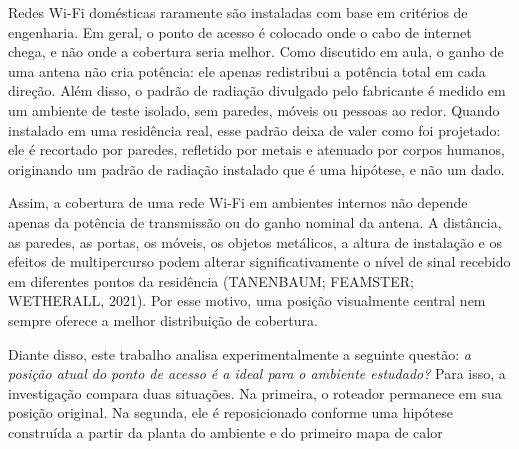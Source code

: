 Redes Wi-Fi domésticas raramente são instaladas com base em critérios de engenharia. 
Em geral, o ponto de acesso é colocado onde o cabo de internet chega, e não onde a cobertura seria melhor. 
Como discutido em aula, o ganho de uma antena não cria potência: ele apenas redistribui a potência total em cada direção. 
Além disso, o padrão de radiação divulgado pelo fabricante é medido em um ambiente de teste isolado, sem paredes, móveis ou pessoas ao redor. 
Quando instalado em uma residência real, esse padrão deixa de valer como foi projetado: ele é recortado por paredes, refletido por metais e atenuado por corpos humanos, originando um padrão de radiação instalado que é uma hipótese, e não um dado.

Assim, a cobertura de uma rede Wi-Fi em ambientes internos não depende apenas da potência de transmissão ou do ganho nominal da antena.
A distância, as paredes, as portas, os móveis, os objetos metálicos, a altura de instalação e os efeitos de multipercurso podem alterar significativamente o nível de sinal recebido em diferentes pontos da residência (TANENBAUM; FEAMSTER; WETHERALL, 2021). 
Por esse motivo, uma posição visualmente central nem sempre oferece a melhor distribuição de cobertura.

Diante disso, este trabalho analisa experimentalmente a seguinte questão: \textit{a posição atual do ponto de acesso é a ideal para o ambiente estudado?} Para isso, a investigação compara duas situações. Na primeira, o roteador permanece em sua posição original. Na segunda, ele é reposicionado conforme uma hipótese construída a partir da planta do ambiente e do primeiro mapa de calor